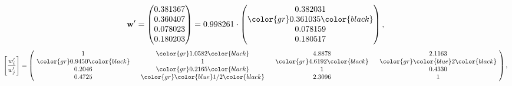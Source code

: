 \begin{example}
\begin{equation*}
\mathbf{w}^{\prime} =
\begin{pmatrix}
0.381367\\
0.360407\\
0.078023\\
0.180203
\end{pmatrix} =
0.998261\cdot
\begin{pmatrix}
0.382031\\
\color{gr} 0.361035\color{black} \\
0.078159\\
0.180517
\end{pmatrix},
\end{equation*}
\begin{equation*}
\left[ \frac{{w}^{\prime}_i}{{w}^{\prime}_j} \right] =
\begin{pmatrix}
$\,\,$ 1 $\,\,$ & $\,\,$\color{gr} 1.0582\color{black} $\,\,$ & $\,\,$4.8878$\,\,$ & $\,\,$2.1163$\,\,$ \\
$\,\,$\color{gr} 0.9450\color{black} $\,\,$ & $\,\,$ 1 $\,\,$ & $\,\,$\color{gr} 4.6192\color{black} $\,\,$ & $\,\,$\color{gr} \color{blue} 2\color{black}   $\,\,$ \\
$\,\,$0.2046$\,\,$ & $\,\,$\color{gr} 0.2165\color{black} $\,\,$ & $\,\,$ 1 $\,\,$ & $\,\,$0.4330 $\,\,$ \\
$\,\,$0.4725$\,\,$ & $\,\,$\color{gr} \color{blue}  1/2\color{black} $\,\,$ & $\,\,$2.3096$\,\,$ & $\,\,$ 1  $\,\,$ \\
\end{pmatrix},
\end{equation*}
\end{example}
\newpage
